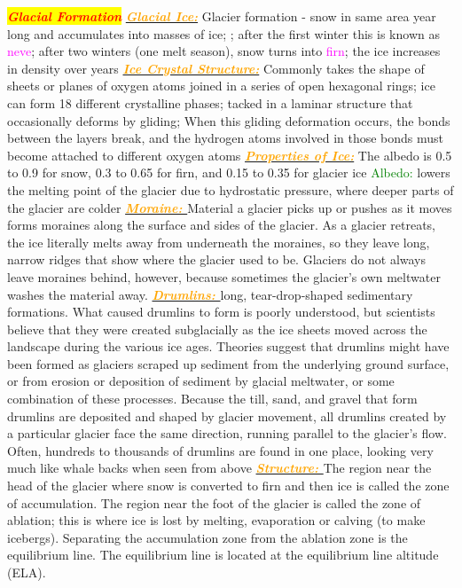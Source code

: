 \documentclass{article}
\newcommand{\red}[1]{\textcolor{red}{#1}}
\newcommand{\green}[1]{\textcolor{green}{#1}}
\newcommand{\pink}[1]{\textcolor{magenta}{#1}}
\newcommand{\orange}[1]{\textcolor{orange}{#1}}
\newcommand{\mysection}[1]{\colorbox{yellow}{{\textbf{\textbf{\textit{\red{#1}}}}}}}
\newcommand{\mysub}[1]{\underline{\textbf{{\textit{\orange{#1}}}}}}
\newcommand{\mysubsub}[1]{{{\green{#1}}}}
\newcommand{\vocab}[1]{{\pink{#1}}}
\begin{document}
\begin{multicols*}{4}
	\mysection{Glacial Formation} %
		\mysub {Glacial Ice:}
		Glacier formation - snow in same area year long and accumulates into masses of ice; ; after the first winter this is known as \vocab{neve}; after two winters (one melt season), snow turns into \vocab{firn}; the ice increases in density over years
		\mysub{Ice Crystal Structure:} 
		Commonly takes the shape of sheets or planes of oxygen atoms joined in a series of open hexagonal rings; ice can form 18 different crystalline phases; tacked in a laminar structure that occasionally deforms by gliding; When this gliding deformation occurs, the bonds between the layers break, and the hydrogen atoms involved in those bonds must become attached to different oxygen atoms
		\mysub{Properties of Ice:} The albedo is 0.5 to 0.9 for snow, 0.3 to 0.65 for firn, and 0.15 to 0.35 for glacier ice
		\mysubsub{Albedo:} lowers the melting point of the glacier due to hydrostatic pressure, where deeper parts of the glacier are colder
		\mysub{Moraine: }
		Material a glacier picks up or pushes as it moves forms moraines along the surface and sides of the glacier. As a glacier retreats, the ice literally melts away from underneath the moraines, so they leave long, narrow ridges that show where the glacier used to be. Glaciers do not always leave moraines behind, however, because sometimes the glacier’s own meltwater washes the material away.
		\mysub{Drumlins: } long, tear-drop-shaped sedimentary formations. What caused drumlins to form is poorly understood, but scientists believe that they were created subglacially as the ice sheets moved across the landscape during the various ice ages. Theories suggest that drumlins might have been formed as glaciers scraped up sediment from the underlying ground surface, or from erosion or deposition of sediment by glacial meltwater, or some combination of these processes. Because the till, sand, and gravel that form drumlins are deposited and shaped by glacier movement, all drumlins created by a particular glacier face the same direction, running parallel to the glacier's flow. Often, hundreds to thousands of drumlins are found in one place, looking very much like whale backs when seen from above
		\mysub{Structure: }The region near the head of the glacier where snow is converted to firn and then ice is called the zone of accumulation.  The region near the foot of the glacier is called the zone of ablation; this is where ice is lost by melting, evaporation or calving (to make icebergs).  Separating the accumulation zone from the ablation zone is the equilibrium line. The equilibrium line is located at the equilibrium line altitude (ELA).

\end{multicols*}
\end{document}
